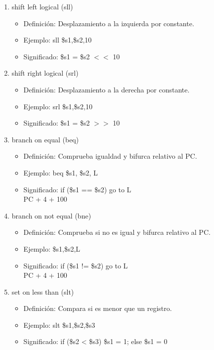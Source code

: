 \documentclass{article}
\begin{document}
\begin{enumerate}
    \item shift left logical (sll)
    \begin{itemize}
        \item Definición: Desplazamiento a la izquierda por constante.
        \item Ejemplo: sll \$s1,\$s2,10
        \item Significado: \$s1 = \$s2 $<<$ 10   
    \end{itemize}

    \item shift right logical (srl)
    \begin{itemize}
        \item Definición: Desplazamiento a la derecha por constante.
        \item Ejemplo: srl \$s1,\$s2,10
        \item Significado: \$s1 = \$s2 $>>$ 10
    \end{itemize}

    \item branch on equal (beq)
    \begin{itemize}
        \item Definición: Comprueba igualdad y bifurca relativo al PC.
        \item Ejemplo: beq \$s1, \$s2, L
        \item Significado: if (\$s1 == \$s2) go to L \\
                           \hspace*{5em} PC + 4 + 100
    \end{itemize}

    \item branch on not equal (bne)
    \begin{itemize}
        \item Definición: Comprueba si no es igual y bifurca relativo al PC.
        \item Ejemplo: \$s1,\$s2,L
        \item Significado: if (\$s1 != \$s2) go to L \\
                           \hspace*{5em} PC + 4 + 100
    \end{itemize}

    \item set on less than (slt)
    \begin{itemize}
        \item Definición: Compara si es menor que un registro.
        \item Ejemplo: slt \$s1,\$s2,\$s3
        \item Significado: if (\$s2 < \$s3) \$s1 = 1;
                           else \$s1 = 0
    \end{itemize}


\end{enumerate}
\end{document}
